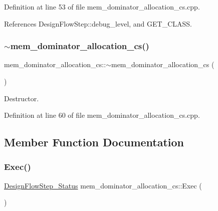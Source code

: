 Definition at line 53 of file mem\+\_\+dominator\+\_\+allocation\+\_\+cs.\+cpp.



References Design\+Flow\+Step\+::debug\+\_\+level, and G\+E\+T\+\_\+\+C\+L\+A\+SS.

\mbox{\label{classmem__dominator__allocation__cs_a4cb4d31bf03b5b68e6a4b656df1c1a6b}} 
\subsubsection{\texorpdfstring{$\sim$mem\+\_\+dominator\+\_\+allocation\+\_\+cs()}{~mem\_dominator\_allocation\_cs()}}
{\footnotesize\ttfamily mem\+\_\+dominator\+\_\+allocation\+\_\+cs\+::$\sim$mem\+\_\+dominator\+\_\+allocation\+\_\+cs (\begin{DoxyParamCaption}{ }\end{DoxyParamCaption})\hspace{0.3cm}{\ttfamily [virtual]}}



Destructor. 



Definition at line 60 of file mem\+\_\+dominator\+\_\+allocation\+\_\+cs.\+cpp.



\subsection{Member Function Documentation}
\mbox{\label{classmem__dominator__allocation__cs_a60f6b1d90b9bf041ba3fe87a486b49ec}} 
\subsubsection{\texorpdfstring{Exec()}{Exec()}}
{\footnotesize\ttfamily \hyperlink{design__flow__step_8hpp_afb1f0d73069c26076b8d31dbc8ebecdf}{Design\+Flow\+Step\+\_\+\+Status} mem\+\_\+dominator\+\_\+allocation\+\_\+cs\+::\+Exec (\begin{DoxyParamCaption}{ }\end{DoxyParamCaption})\hspace{0.3cm}{\ttfamily [virtual]}}



